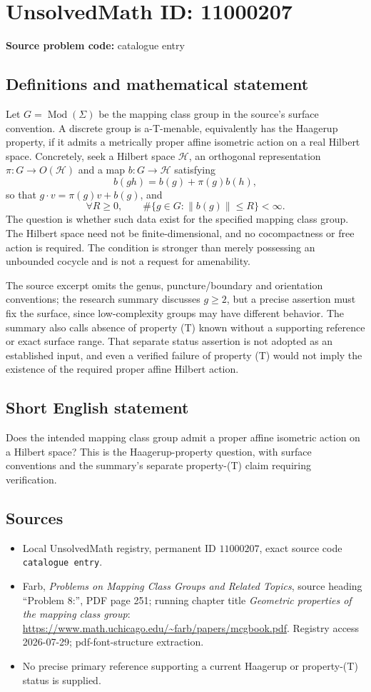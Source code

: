 \documentclass[11pt]{article}
\begin{document}
\section*{UnsolvedMath ID: 11000207}
\textbf{Source problem code:} catalogue entry
\subsection{Definitions and mathematical statement}
Let \(G=\operatorname{Mod}(\Sigma)\) be the mapping class group in the source's surface convention. A discrete group is a-T-menable, equivalently has the Haagerup property, if it admits a metrically proper affine isometric action on a real Hilbert space. Concretely, seek a Hilbert space \(\mathcal H\), an orthogonal representation \(\pi:G\to O(\mathcal H)\) and a map \(b:G\to\mathcal H\) satisfying
\[b(gh)=b(g)+\pi(g)b(h),\]
so that \(g\cdot v=\pi(g)v+b(g)\), and
\[\forall R\geq0,\qquad\#\{g\in G:\lVert b(g)\rVert\leq R\}<\infty.\]
The question is whether such data exist for the specified mapping class group. The Hilbert space need not be finite-dimensional, and no cocompactness or free action is required. The condition is stronger than merely possessing an unbounded cocycle and is not a request for amenability.

The source excerpt omits the genus, puncture/boundary and orientation conventions; the research summary discusses \(g\geq2\), but a precise assertion must fix the surface, since low-complexity groups may have different behavior. The summary also calls absence of property (T) known without a supporting reference or exact surface range. That separate status assertion is not adopted as an established input, and even a verified failure of property (T) would not imply the existence of the required proper affine Hilbert action.
\subsection{Short English statement}
Does the intended mapping class group admit a proper affine isometric action on a Hilbert space? This is the Haagerup-property question, with surface conventions and the summary's separate property-(T) claim requiring verification.
\subsection{Sources}
\begin{itemize}
\item Local UnsolvedMath registry, permanent ID \(11000207\), exact source code \texttt{catalogue entry}.
\item Farb, \emph{Problems on Mapping Class Groups and Related Topics}, source heading ``Problem 8:'', PDF page 251; running chapter title \emph{Geometric properties of the mapping class group}: \url{https://www.math.uchicago.edu/~farb/papers/mcgbook.pdf}. Registry access 2026-07-29; pdf-font-structure extraction.
\item No precise primary reference supporting a current Haagerup or property-(T) status is supplied.
\end{itemize}
\end{document}
